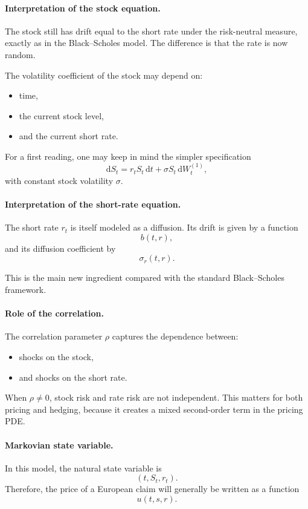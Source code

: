 \documentclass[11pt]{article}
\theoremstyle{plain}
\theoremstyle{definition}
\theoremstyle{remark}
\begin{document}
\paragraph{Interpretation of the stock equation.}
The stock still has drift equal to the short rate under the
risk-neutral measure, exactly as in the Black--Scholes model.
The difference is that the rate is now random.

The volatility coefficient of the stock may depend on:
\begin{itemize}[leftmargin=1.4em]
    \item time,
    \item the current stock level,
    \item and the current short rate.
\end{itemize}

For a first reading, one may keep in mind the simpler specification
\[
\mathrm{d}S_t
=
r_tS_t\,\mathrm{d}t
+
\sigma S_t\,\mathrm{d}W_t^{(1)},
\]
with constant stock volatility \(\sigma\).

\paragraph{Interpretation of the short-rate equation.}
The short rate \(r_t\) is itself modeled as a diffusion.
Its drift is given by a function
\[
b(t,r),
\]
and its diffusion coefficient by
\[
\sigma_r(t,r).
\]

This is the main new ingredient compared with the standard
Black--Scholes framework.

\paragraph{Role of the correlation.}
The correlation parameter \(\rho\) captures the dependence between:
\begin{itemize}[leftmargin=1.4em]
    \item shocks on the stock,
    \item and shocks on the short rate.
\end{itemize}

When \(\rho\neq 0\), stock risk and rate risk are not independent.
This matters for both pricing and hedging, because it creates a mixed
second-order term in the pricing PDE.

\paragraph{Markovian state variable.}
In this model, the natural state variable is
\[
(t,S_t,r_t).
\]
Therefore, the price of a European claim will generally be written as a
function
\[
u(t,s,r).
\]
\end{document}
